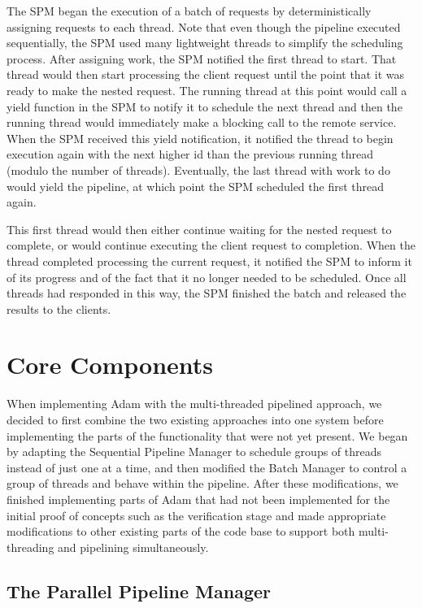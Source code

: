 \documentclass[11pt, oneside]{report}
\begin{document}
The SPM began the execution of a batch of requests by deterministically assigning requests to each thread.
Note that even though the pipeline executed sequentially, the SPM used many lightweight threads to simplify the scheduling process. 
After assigning work, the SPM notified the first thread to start. 
That thread would then start processing the client request until the point that it was ready to make the nested request. 
The running thread at this point would call a yield function in the SPM to notify it to schedule the next thread and then the running thread would immediately make a blocking call to the remote service. 
When the SPM received this yield notification, it notified the thread to begin execution again with the next higher id than the previous running thread (modulo the number of threads). 
Eventually, the last thread with work to do would yield the pipeline, at which point the SPM scheduled the first thread again. 

This first thread would then either continue waiting for the nested request to complete, or would continue executing the client request to completion. 
When the thread completed processing the current request, it notified the SPM to inform it of its progress and of the fact that it no longer needed to be scheduled. 
Once all threads had responded in this way, the SPM finished the batch and released the results to the clients.

\section{Core Components}

When implementing Adam with the multi-threaded pipelined approach, we decided to first combine the two existing approaches into one system before implementing the parts of the functionality that were not yet present. 
We began by adapting the Sequential Pipeline Manager to schedule groups of threads instead of just one at a time, and then modified the Batch Manager to control a group of threads and behave within the pipeline.
After these modifications, we finished implementing parts of Adam that had not been implemented for the initial proof of concepts such as the verification stage and made appropriate modifications to other existing parts of the code base to support both multi-threading and pipelining simultaneously.

\subsection{The Parallel Pipeline Manager}
\end{document}
